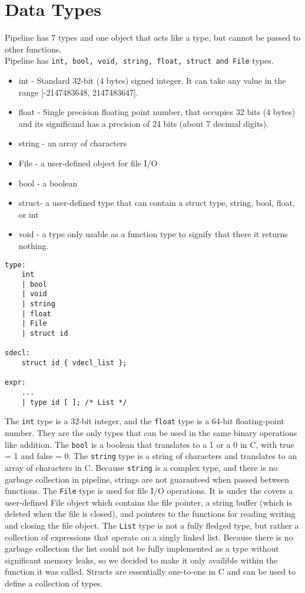 \documentclass[./LRM_main.tex]{subfiles}
\begin{document}
\section{Data Types}
Pipeline has 7 types and one object that acts like a type, but cannot be passed to other functions. \\
Pipeline has \texttt{int, bool, void, string, float, struct and File} types.
\begin{itemize}
    \item int -  Standard 32-bit (4 bytes) signed integer. It can take any value in the range [-2147483648, 2147483647].
    \item float - Single precision floating point number, that occupies 32 bits (4 bytes) and its significand has a precision of 24 bits (about 7 decimal digits). 
    \item string - an array of characters
    \item File - a user-defined object for file I/O
    \item bool - a boolean
    \item struct- a user-defined type that can contain a struct type, string, bool, float, or int
    \item void - a type only usable as a function type to signify that there it returns nothing.
\end{itemize}
\begin{lstlisting}
type:
    int
    | bool
    | void
    | string
    | float
    | File
    | struct id

sdecl:
    struct id { vdecl_list };

expr:
	...
	| type id [ ]; /* List */

\end{lstlisting}
The \texttt{int} type is a 32-bit integer, and the \texttt{float} type is a 64-bit floating-point number. They are the only types that can be used in the same binary operations like addition. The \texttt{bool} is a boolean that translates to a 1 or a 0 in C, with true = 1 and false = 0. The \texttt{string} type is a string of characters and translates to an array of characters in C. Because \texttt{string} is a complex type, and there is no garbage collection in pipeline, strings are not guaranteed when passed between functions. The \texttt{File} type is used for file I/O operations. It is under the covers a user-defined File object which contains the file pointer, a string buffer (which is deleted when the file is closed), and pointers to the functions for reading writing and closing the file object. The \texttt{List} type is not a fully fledged type, but rather a collection of expressions that operate on a singly linked list. Because there is no garbage collection the list could not be fully implemented as a type without significant memory leaks, so we decided to make it only availible within the function it was called. Structs are essentially one-to-one in C and can be used to define a collection of types.
\end{document}

